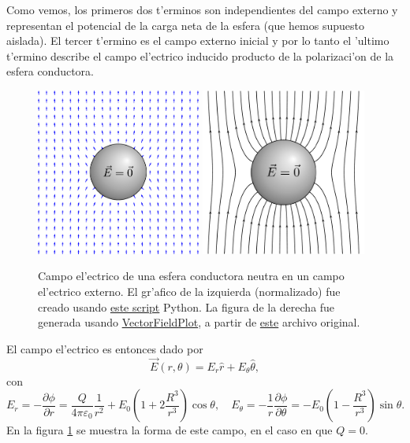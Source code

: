 Como vemos, los primeros dos t'erminos son independientes del campo externo y representan el potencial de la carga neta de la esfera (que hemos supuesto aislada). El tercer t'ermino es el campo externo inicial y por lo tanto el 'ultimo t'ermino describe el campo el'ectrico inducido producto de la polarizaci'on de la esfera conductora.
\begin{figure}[!h]
\centerline{\includegraphics[height=5.5cm]{fig/fig-esfera-conductora-campo-externo.pdf}
\hspace{1cm}
\includegraphics[height=5.5cm]{fig/fig-esfera-conductora-campo-externo-2.pdf}}
\caption{Campo el'ectrico de una esfera conductora neutra en un campo el'ectrico externo. El gr'afico de la izquierda (normalizado) fue creado usando \href{https://github.com/gfrubi/electrodinamica/blob/master/figuras-editables/fig-esfera-conductora-campo-externo-raw.py}{este script} Python. La figura de la derecha fue generada usando \href{http://commons.wikimedia.org/wiki/User:Geek3/VectorFieldPlot}{VectorFieldPlot}, a partir de \href{http://commons.wikimedia.org/wiki/File:VFPt_superconductor_ball_E-field.svg}{este} archivo original.}
\label{fig:ecce}
\end{figure}

El campo el'ectrico es entonces dado por
\begin{equation}
\vec{E}(r,\theta) = E_r\hat{r}+E_\theta\hat{\theta},
\end{equation}
con 
\begin{equation}
E_r = -\frac{\partial\phi}{\partial r} = \frac{Q}{4\pi\varepsilon_0}\frac{1}{r^2}+E_0 \left(1+2\frac{R^3}{r^3}\right)\cos\theta, \quad E_\theta = -\frac{1}{r}\frac{\partial\phi}{\partial\theta} =-E_0 \left(1-\frac{R^3}{r^3}\right)\sin\theta .
\end{equation}
En la figura \ref{fig:ecce} se muestra la forma de este campo, en el caso en que $Q=0$.



